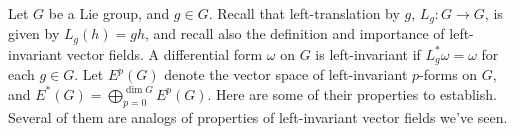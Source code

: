 \documentclass{article}
\newtheorem{plm}{Problem}
\begin{document}
Let $G$ be a Lie group, and $g \in G$.
Recall that left-translation by $g$, $L_{g}: G \to G$, is given by $L_{g}(h) = gh$,
and recall also the definition and importance of left-invariant vector fields.
A differential form $\omega$ on $G$ is left-invariant if $L_{g}^{*}\omega = \omega$ for each $g \in G$.
Let $E^{p}(G)$ denote the vector space of left-invariant $p$-forms on $G$, and $E^{*}(G) = \bigoplus_{p = 0}^{\dim G}E^{p}(G)$.
Here are some of their properties to establish.
Several of them are analogs of properties of left-invariant vector fields we've seen.




\end{document}
